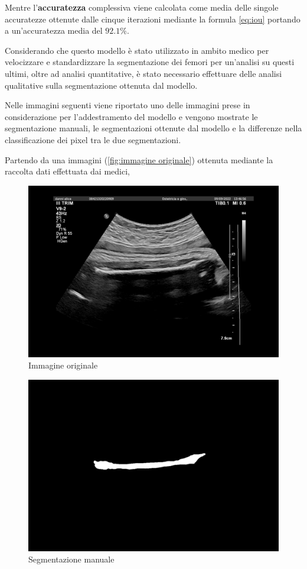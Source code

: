 Mentre l'\textbf{accuratezza} complessiva viene calcolata come media delle singole accuratezze
ottenute dalle cinque iterazioni mediante la formula \ref{eq:iou} portando a un'accuratezza media del \textbf{$92.1\%$}.




Considerando che questo modello \`e stato utilizzato in ambito medico per velocizzare e standardizzare 
la segmentazione dei femori per un'analisi su questi ultimi, oltre ad analisi quantitative, \`e stato 
necessario effettuare delle analisi qualitative sulla segmentazione ottenuta dal modello.

Nelle immagini seguenti viene riportato uno delle immagini prese in considerazione per l'addestramento del modello
e vengono mostrate le segmentazione manuali, le segmentazioni ottenute dal modello e la differenze 
nella classificazione dei pixel tra le due segmentazioni.





Partendo da una immagini (\autoref{fig:immagine originale}) ottenuta mediante la raccolta dati effettuata dai medici, 

\begin{figure}[H]
    \centering
    \includegraphics[width=0.7\columnwidth]{Immagini/image.png}
    \caption{Immagine originale}
    \label{fig:immagine originale}
\end{figure}



\begin{figure}[H]
    \centering
    \includegraphics[width=0.7\columnwidth]{Immagini/mask.png}
    \caption{Segmentazione manuale}
    \label{fig:segmentazione manuale}
\end{figure}

